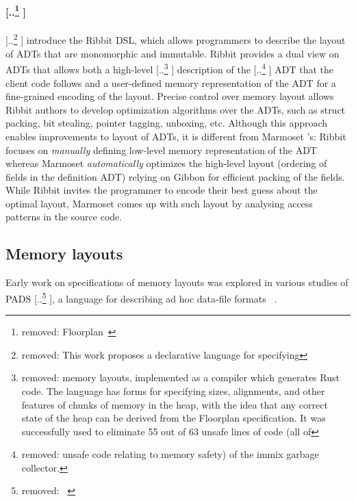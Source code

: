 \documentclass[acmsmall,review,anonymous]{acmart}\settopmatter{printfolios=true,printccs=false,printacmref=false}
\newcommand{\system}{{\sc Marmoset}\xspace}
\newcommand{\ribbit}{{\sc Ribbit}\xspace} %
\newcommand{\gibbon}{{\sc Gibbon}\xspace}
\providecommand{\DIFaddtex}[1]{{\protect\color{blue} \sf #1}} %
\providecommand{\DIFdeltex}[1]{{\protect\color{red} [..\footnote{removed: #1} ]}} %
\providecommand{\DIFaddbegin}{} %
\providecommand{\DIFaddend}{} %
\providecommand{\DIFdelbegin}{} %
\providecommand{\DIFdelend}{} %
\providecommand{\DIFadd}[1]{\texorpdfstring{\DIFaddtex{#1}}{#1}} %
\providecommand{\DIFdel}[1]{\texorpdfstring{\DIFdeltex{#1}}{}} %
\newcommand{\DIFscaledelfig}{0.5}
\newlength{\DIFdelgraphicswidth} %
\newlength{\DIFdelgraphicsheight} %
\newcommand{\DIFaddincludegraphics}[2][]{{\color{blue}\fbox{\DIFOincludegraphics[#1]{#2}}}} %
\newcommand{\DIFdelincludegraphics}[2][]{%
\sbox{\DIFdelgraphicsbox}{\DIFOincludegraphics[#1]{#2}}%
\settoboxwidth{\DIFdelgraphicswidth}{\DIFdelgraphicsbox} %
\settoboxtotalheight{\DIFdelgraphicsheight}{\DIFdelgraphicsbox} %
\scalebox{\DIFscaledelfig}{%
\parbox[b]{\DIFdelgraphicswidth}{\usebox{\DIFdelgraphicsbox}\\[-\baselineskip] \rule{\DIFdelgraphicswidth}{0em}}\llap{\resizebox{\DIFdelgraphicswidth}{\DIFdelgraphicsheight}{%
\setlength{\unitlength}{\DIFdelgraphicswidth}%
\begin{picture}(1,1)%
\thicklines\linethickness{2pt} %
{\color[rgb]{1,0,0}\put(0,0){\framebox(1,1){}}}%
{\color[rgb]{1,0,0}\put(0,0){\line( 1,1){1}}}%
{\color[rgb]{1,0,0}\put(0,1){\line(1,-1){1}}}%
\end{picture}%
}\hspace*{3pt}}} %
} %
\DeclareRobustCommand{\DIFaddbegin}{\DIFOaddbegin \let\includegraphics\DIFaddincludegraphics} %
\DeclareRobustCommand{\DIFaddend}{\DIFOaddend \let\includegraphics\DIFOincludegraphics} %
\DeclareRobustCommand{\DIFdelbegin}{\DIFOdelbegin \let\includegraphics\DIFdelincludegraphics} %
\DeclareRobustCommand{\DIFdelend}{\DIFOaddend \let\includegraphics\DIFOincludegraphics} %
\begin{document}
\paragraph{\DIFdel{Floorplan~\cite{Floorplan}}} %
\addtocounter{paragraph}{-1}%
\DIFdel{This work proposes a declarative language for specifying }\DIFdelend \DIFaddbegin \DIFadd{\citet{BitStealingMadeLegal} introduce the }\ribbit \DIFadd{DSL, which allows programmers to describe the layout of ADTs that are monomorphic and immutable.
}\ribbit \DIFadd{provides a dual view on ADTs that allows both a }\DIFaddend high-level \DIFdelbegin \DIFdel{memory layouts, implemented as a compiler which generates Rust code. The language has forms for specifying sizes, alignments, and other features of chunks of memory in the heap, with the idea that any correct state of the heap can be derived from the Floorplan specification. It was successfully used to eliminate 55 out of 63 unsafe lines of code (all of }\DIFdelend \DIFaddbegin \DIFadd{description of }\DIFaddend the \DIFdelbegin \DIFdel{unsafe code relating to memory safety) of the immix garbage collector.
}\DIFdelend \DIFaddbegin \DIFadd{ADT that the client code follows and a user-defined memory representation of the ADT
for a fine-grained encoding of the layout. Precise control over memory layout allows }\ribbit \DIFadd{authors to develop optimization algorithms over the ADTs, such as struct packing, bit stealing, pointer tagging, unboxing, etc.
Although this approach enables improvements to layout of ADTs, it is different from }\system\DIFadd{'s: }\ribbit \DIFadd{focuses on \emph{manually} defining low-level memory representation of the ADT whereas }\system \DIFadd{\emph{automatically} optimizes the high-level layout (ordering of fields in the definition ADT) relying on }\gibbon \DIFadd{for efficient packing of the fields.
While }\ribbit \DIFadd{invites the programmer to encode their best guess about the optimal layout, }\system \DIFadd{comes up with such layout by analysing access patterns in the source code.
}\DIFaddend 


\DIFaddbegin \subsection{\DIFadd{Memory layouts}}


\DIFaddend Early work on specifications of memory layouts was explored in various studies of PADS\DIFdelbegin \DIFdel{~\cite{PADS, Pads2, Pads3}}\DIFdelend , a language for describing ad hoc data-file formats\DIFaddbegin \DIFadd{~\cite{PADS, Pads2, Pads3}}\DIFaddend .
\end{document}
